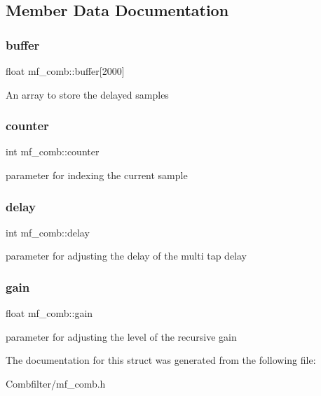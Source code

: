 \subsection{Member Data Documentation}
\mbox{\label{structmf__comb_a0fc2e7d60244597a0b9c221dea042cca}} 
\subsubsection{\texorpdfstring{buffer}{buffer}}
{\footnotesize\ttfamily float mf\+\_\+comb\+::buffer\mbox{[}2000\mbox{]}}

An array to store the delayed samples \mbox{\label{structmf__comb_ab7a1f487fb56b06ee98393dec50c36ee}} 
\subsubsection{\texorpdfstring{counter}{counter}}
{\footnotesize\ttfamily int mf\+\_\+comb\+::counter}

parameter for indexing the current sample \mbox{\label{structmf__comb_a7d1902007eda85c94aab30d2d4c5607a}} 
\subsubsection{\texorpdfstring{delay}{delay}}
{\footnotesize\ttfamily int mf\+\_\+comb\+::delay}

parameter for adjusting the delay of the multi tap delay \mbox{\label{structmf__comb_a395f06c6d6486d3408b4fc1a45f0ed4b}} 
\subsubsection{\texorpdfstring{gain}{gain}}
{\footnotesize\ttfamily float mf\+\_\+comb\+::gain}

parameter for adjusting the level of the recursive gain 

The documentation for this struct was generated from the following file\+:\begin{DoxyCompactItemize}
\item 
Combfilter/mf\+\_\+comb.\+h\end{DoxyCompactItemize}
